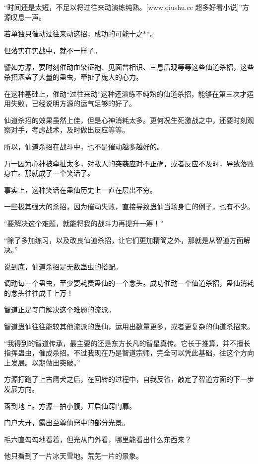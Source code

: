 
\begin{this_body}

“时间还是太短，不足以将过往来动演练纯熟。[www.qiushu.cc 超多好看小说]”方源叹息一声。

若单独只催动过往来动这招，成功的可能十之**。

但落实在实战中，就不一样了。

譬如方源，要时刻催动血染征袍、见面曾相识、三息后现等等这些仙道杀招，这些杀招涵盖了大量的蛊虫，牵扯了庞大的心力。

在这种基础上，催动“过往来动”这种还演练不纯熟的仙道杀招，能够在第三次才运用失败，已经说明方源的运气足够的好了。

仙道杀招的效果虽然上佳，但是心神消耗太多。更何况生死激战之中，还要时刻观察对手，考虑战术，及时做出反应等等。

所以，仙道杀招在战斗中，也不是催动越多越好的。

万一因为心神被牵扯太多，对敌人的突袭应对不正确，或者反应不及时，导致落败身亡。那就成了一个笑话了。

事实上，这种笑话在蛊仙历史上一直在层出不穷。

一些极其强大的杀招，因为催动失败，直接导致蛊仙当场身亡的例子，也有不少。

“要解决这个难题，就能将我的战斗力再提升一筹！”

“除了多加练习，以及改良仙道杀招，让它们更加精简之外，那就是从智道方面解决。”

说到底，仙道杀招是无数蛊虫的搭配。

调动每一个蛊虫，至少要耗费蛊仙的一个念头。成功催动一个仙道杀招，蛊仙消耗的念头往往成千上万！

智道正是专门解决这个难题的流派。

智道蛊仙往往能较其他流派的蛊仙，运用出数量更多，或者更复杂的仙道杀招来。

“我得到的智道传承，最主要的还是东方长凡的智星真传。它长于推算，并不擅长指挥蛊虫，催成杀招。不过我现在乃是智道宗师，完全可以凭此基础，往这个方向上发展。以期做出突破。”

方源打跑了上古鹰犬之后，在回转的过程中，自我反省，敲定了智道方面的下一步发展方向。

落到地上。方源一拍小腹，开启仙窍门扉。

门户大开，露出至尊仙窍中的部分光景。

毛六直勾勾地看着，但光从门外看，哪里能看出什么东西来？

他只看到了一片冰天雪地。荒芜一片的景象。


\end{this_body}
